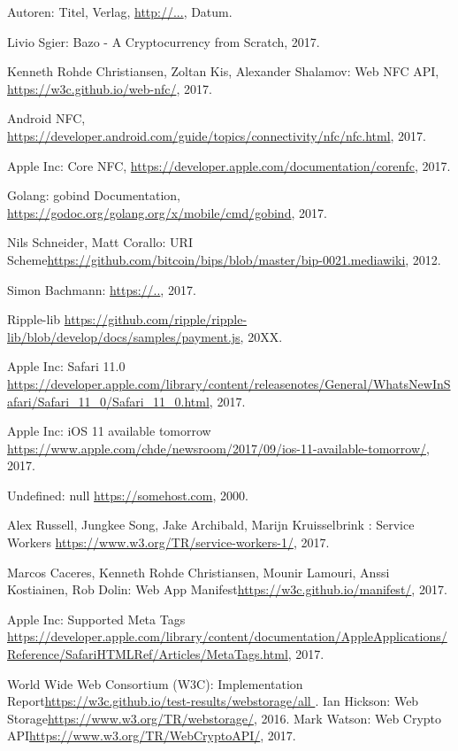 \begin{thebibliography}{99}

 Autoren: Titel, Verlag, \url{http://...}, Datum.

 Livio Sgier: Bazo - A Cryptocurrency from Scratch, 2017.

 Kenneth Rohde Christiansen, Zoltan Kis, Alexander Shalamov: Web NFC API, \url{https://w3c.github.io/web-nfc/}, 2017.


 Android NFC, \url{https://developer.android.com/guide/topics/connectivity/nfc/nfc.html}, 2017.

 Apple Inc: Core NFC, \url{https://developer.apple.com/documentation/corenfc}, 2017.

 Golang: gobind Documentation, \url{https://godoc.org/golang.org/x/mobile/cmd/gobind}, 2017.

 Nils Schneider, Matt Corallo: URI Scheme\url{https://github.com/bitcoin/bips/blob/master/bip-0021.mediawiki}, 2012.

 Simon Bachmann:  \url{https://..}, 2017.

 Ripple-lib  \url{https://github.com/ripple/ripple-lib/blob/develop/docs/samples/payment.js}, 20XX.

 Apple Inc: Safari 11.0  \url{https://developer.apple.com/library/content/releasenotes/General/WhatsNewInSafari/Safari_11_0/Safari_11_0.html}, 2017.

 Apple Inc: iOS 11 available tomorrow \url{https://www.apple.com/chde/newsroom/2017/09/ios-11-available-tomorrow/}, 2017.

 Undefined: null \url{https://somehost.com}, 2000.

 Alex Russell, Jungkee Song, Jake Archibald, Marijn Kruisselbrink : Service Workers \url{https://www.w3.org/TR/service-workers-1/}, 2017.

 Marcos Caceres, 
Kenneth Rohde Christiansen, Mounir Lamouri, Anssi Kostiainen, Rob Dolin: Web App Manifest\url{https://w3c.github.io/manifest/}, 2017.

 Apple Inc: Supported Meta Tags \url{https://developer.apple.com/library/content/documentation/AppleApplications/Reference/SafariHTMLRef/Articles/MetaTags.html}, 2017.

 World Wide Web Consortium (W3C): Implementation Report\url{https://w3c.github.io/test-results/webstorage/all
}.
 Ian Hickson: Web Storage\url{https://www.w3.org/TR/webstorage/}, 2016.
 Mark Watson: Web Crypto API\url{https://www.w3.org/TR/WebCryptoAPI/}, 2017.


\end{thebibliography}
